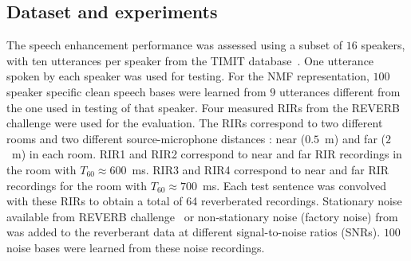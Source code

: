 \subsection{Dataset and experiments}
The speech enhancement performance was assessed using a subset of $16$ speakers, with ten utterances per speaker from the TIMIT database~\cite{garofolo1993timit}. One utterance spoken by each speaker was used for testing.
For the NMF representation, $100$ speaker specific clean speech bases were learned from $9$ utterances different from the one used in testing of that speaker.
Four measured RIRs from the REVERB challenge \cite{kinoshita2016summary} were used for the evaluation. The RIRs correspond to two different rooms and two different source-microphone distances : near ($0.5$~m) and far ($2$~m) in each room. RIR1 and RIR2 correspond to near and far RIR recordings in the room with $T_{60}\approx600$~ms. RIR3 and RIR4 correspond to near and far RIR recordings for the room with $T_{60}\approx700$~ms. 
Each test sentence was convolved with these RIRs to obtain a total of 64 reverberated recordings. 
Stationary noise available from REVERB challenge~\cite{kinoshita2016summary} or non-stationary noise (factory noise) from~\cite{varga1993assessment} was added to the reverberant data at different signal-to-noise ratios (SNRs). $100$ noise bases were learned from these noise recordings.

